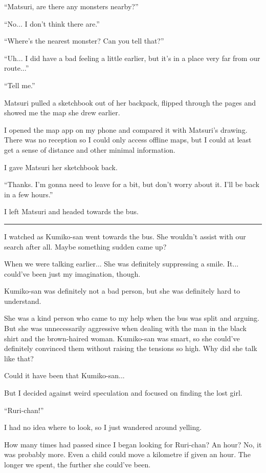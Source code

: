 ``Matsuri, are there any monsters nearby?''

``No... I don't think there are.''

``Where's the nearest monster? Can you tell that?''

``Uh... I did have a bad feeling a little earlier, but it's in a place very far from our route...''

``Tell me.''

Matsuri pulled a sketchbook out of her backpack, flipped through the pages and showed me the map she drew earlier.

I opened the map app on my phone and compared it with Matsuri's drawing. There was no reception so I could only access offline maps, but I could at least get a sense of distance and other minimal information.

I gave Matsuri her sketchbook back.

``Thanks. I'm gonna need to leave for a bit, but don't worry about it. I'll be back in a few hours.''

I left Matsuri and headed towards the bus.

\vspace{\baselineskip}
\hrule
\vspace{\baselineskip}

I watched as Kumiko-san went towards the bus. She wouldn't assist with our search after all. Maybe something sudden came up?

When we were talking earlier... She was definitely suppressing a smile. It... could've been just my imagination, though.

Kumiko-san was definitely not a bad person, but she was definitely hard to understand.

She was a kind person who came to my help when the bus was split and arguing. But she was unnecessarily aggressive when dealing with the man in the black shirt and the brown-haired woman. Kumiko-san was smart, so she could've definitely convinced them without raising the tensions so high. Why did she talk like that?

Could it have been that Kumiko-san...

But I decided against weird speculation and focused on finding the lost girl.

``Ruri-chan!''

I had no idea where to look, so I just wandered around yelling.

How many times had passed since I began looking for Ruri-chan? An hour? No, it was probably more. Even a child could move a kilometre if given an hour. The longer we spent, the further she could've been.

